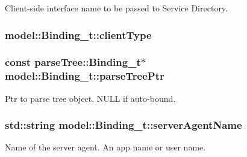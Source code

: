 Client-\/side interface name to be passed to Service Directory. 

\subsubsection[{\texorpdfstring{client\+Type}{clientType}}]{ model\+::\+Binding\+\_\+t\+::client\+Type}\hypertarget{structmodel_1_1_binding__t_a4bac2608cb98d165467423924f9c0f31}{}\label{structmodel_1_1_binding__t_a4bac2608cb98d165467423924f9c0f31}
\subsubsection[{\texorpdfstring{parse\+Tree\+Ptr}{parseTreePtr}}]{\setlength{\rightskip}{0pt plus 5cm}const {\bf parse\+Tree\+::\+Binding\+\_\+t}$\ast$ model\+::\+Binding\+\_\+t\+::parse\+Tree\+Ptr}\hypertarget{structmodel_1_1_binding__t_a8177ea0ca24e1d2636e84ffdbd1390f3}{}\label{structmodel_1_1_binding__t_a8177ea0ca24e1d2636e84ffdbd1390f3}


Ptr to parse tree object. N\+U\+LL if auto-\/bound. 

\subsubsection[{\texorpdfstring{server\+Agent\+Name}{serverAgentName}}]{\setlength{\rightskip}{0pt plus 5cm}std\+::string model\+::\+Binding\+\_\+t\+::server\+Agent\+Name}\hypertarget{structmodel_1_1_binding__t_ad40c0c6b7258030addaee688b9c910ba}{}\label{structmodel_1_1_binding__t_ad40c0c6b7258030addaee688b9c910ba}


Name of the server agent. An app name or user name. 


